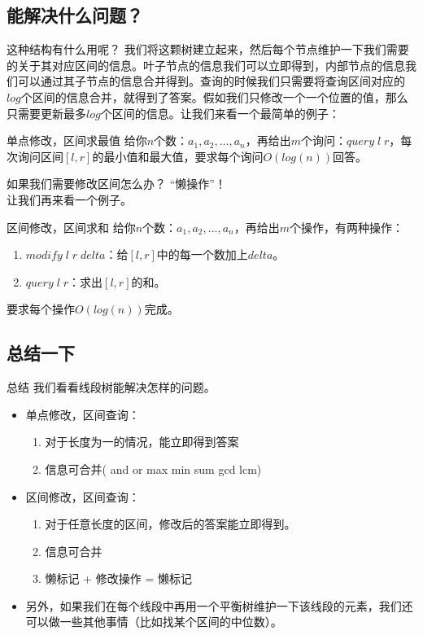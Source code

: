 \documentclass{beamer}
\begin{document}
		\subsection{能解决什么问题？}
			\begin{frame}{这种结构有什么用呢？}
				我们将这颗树建立起来，然后每个节点维护一下我们需要的关于其对应区间的信息。叶子节点的信息我们可以立即得到，内部节点的信息我们可以通过其子节点的信息合并得到。查询的时候我们只需要将查询区间对应的$log$个区间的信息合并，就得到了答案。假如我们只修改一个一个位置的值，那么只需要更新最多$log$个区间的信息。让我们来看一个最简单的例子：
				\begin{block}{单点修改，区间求最值}
					给你$n$个数：$a_1, a_2, \dots , a_n$，再给出$m$个询问：$query\;l\;r$，每次询问区间$[l,r]$的最小值和最大值，要求每个询问$O(log(n))$回答。
				\end{block} 
			\end{frame}
			\begin{frame}{如果我们需要修改区间怎么办？}
				“懒操作”！\\
				让我们再来看一个例子。
				\begin{block}{区间修改，区间求和}
					给你$n$个数：$a_1, a_2, \dots , a_n$，再给出$m$个操作，有两种操作：
					\begin{enumerate}
						\item  $modify\;l\;r\;delta$：给$[l,r]$中的每一个数加上$delta$。
						\item $query\;l\;r$：求出$[l,r]$的和。
					\end{enumerate}
					要求每个操作$O(log(n))$完成。
				\end{block}
			\end{frame}
		\subsection{总结一下}
			\begin{frame}{总结}
				我们看看线段树能解决怎样的问题。\\
				\begin{itemize}
					\item 单点修改，区间查询：\\
						\begin{enumerate}
							\item 对于长度为一的情况，能立即得到答案
							\item 信息可合并( and or max min sum gcd lcm)  
						\end{enumerate}
					\item 区间修改，区间查询：\\
						\begin{enumerate}
							\item 对于任意长度的区间，修改后的答案能立即得到。
							\item 信息可合并
							\item 懒标记 + 修改操作 = 懒标记
						\end{enumerate}
					\item 另外，如果我们在每个线段中再用一个平衡树维护一下该线段的元素，我们还可以做一些其他事情（比如找某个区间的中位数）。
				\end{itemize}
			\end{frame} 
\end{document}
